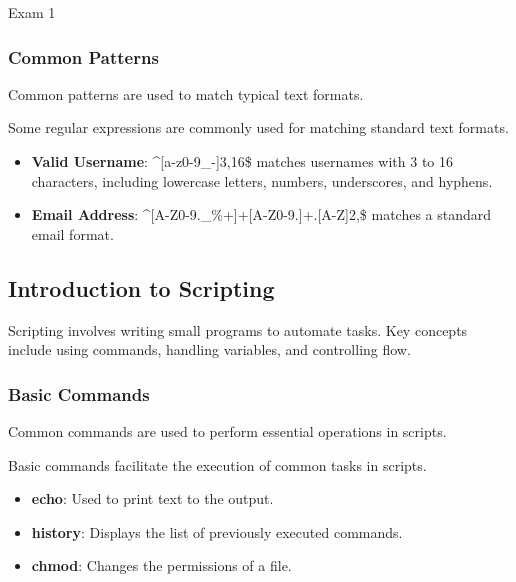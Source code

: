 \begin{examnotes}{Exam 1}
    \subsubsection*{Common Patterns}

    Common patterns are used to match typical text formats.

    \begin{highlight}
        Some regular expressions are commonly used for matching standard text formats.
        
        \begin{itemize}
            \item \textbf{Valid Username}: \^{}[a-z0-9\_-]{3,16}\$ matches usernames with 3 to 16 characters, including lowercase letters, numbers, underscores, and hyphens.
            \item \textbf{Email Address}: \^{}[A-Z0-9.\_\%+\-]+\@[A-Z0-9.\-]+.[A-Z]{2,}\$ matches a standard email format.
        \end{itemize}
    \end{highlight}

    \subsection*{Introduction to Scripting}

    Scripting involves writing small programs to automate tasks. Key concepts include using commands, handling variables, and controlling flow.

    \subsubsection*{Basic Commands}

    Common commands are used to perform essential operations in scripts.

    \begin{highlight}
        Basic commands facilitate the execution of common tasks in scripts.
        
        \begin{itemize}
            \item \textbf{echo}: Used to print text to the output.
            \item \textbf{history}: Displays the list of previously executed commands.
            \item \textbf{chmod}: Changes the permissions of a file.
        \end{itemize}
    \end{highlight}


\end{examnotes}
